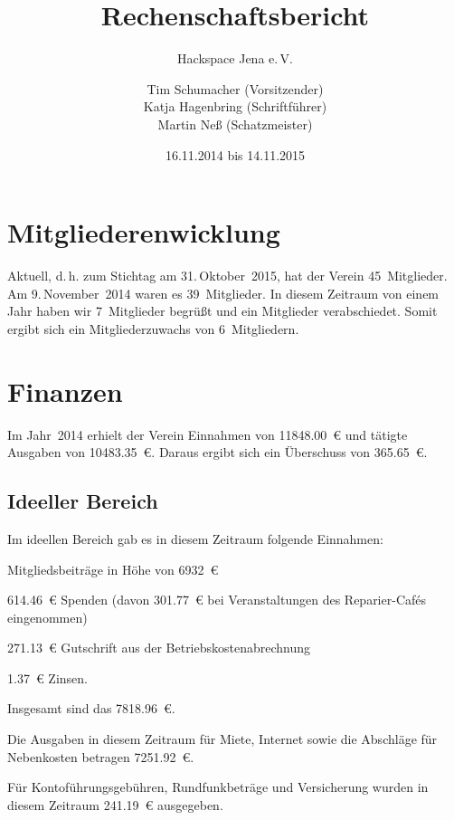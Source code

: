 \documentclass[ngerman]{scrartcl}
\title{Rechenschaftsbericht}
\subtitle{Hackspace Jena e.\,V.}
\author{%
	Tim Schumacher (Vorsitzender)\\
	Katja Hagenbring (Schriftführer)\\
	Martin Neß (Schatzmeister)
}
\date{16.11.2014 bis 14.11.2015}
\begin{document}
\maketitle{}

\tableofcontents{}

\newpage{}

\section{Mitgliederenwicklung}

Aktuell, d.\,h. zum Stichtag am 31.\,Oktober~2015, hat der Verein 45~Mitglieder. Am 9.\,November~2014 waren es 39~Mitglieder.
In diesem Zeitraum von einem Jahr haben wir 7~Mitglieder begrüßt und ein Mitglieder verabschiedet.
Somit ergibt sich ein Mitgliederzuwachs von 6~Mitgliedern.

\section{Finanzen}

Im Jahr~2014 erhielt der Verein Einnahmen von \num{11848,00}~\euro{} und tätigte Ausgaben von \num{10483,35}~\euro{}.
Daraus ergibt sich ein Überschuss von \num{365,65}~\euro{}.

\subsection{Ideeller Bereich}
\label{sec:ideeller_bereich}

Im ideellen Bereich gab es in diesem Zeitraum folgende Einnahmen:
\begin{compactitem}
\item Mitgliedsbeiträge in Höhe von \num{6932}~\euro{}
\item \num{614,46}~\euro{} Spenden (davon \num{301,77}~\euro{} bei Veranstaltungen des Reparier-Cafés eingenommen)
\item \num{271,13}~\euro{} Gutschrift aus der Betriebskostenabrechnung
\item \num{1,37}~\euro{} Zinsen.
\end{compactitem}
Insgesamt sind das \num{7818,96}~\euro{}.

Die Ausgaben in diesem Zeitraum für Miete, Internet sowie die Abschläge für Nebenkosten betragen \num{7251,92}~\euro{}.

Für Kontoführungsgebühren, Rundfunkbeträge und Versicherung wurden in diesem Zeitraum \num{241.19}~\euro{} ausgegeben.
\end{document}
